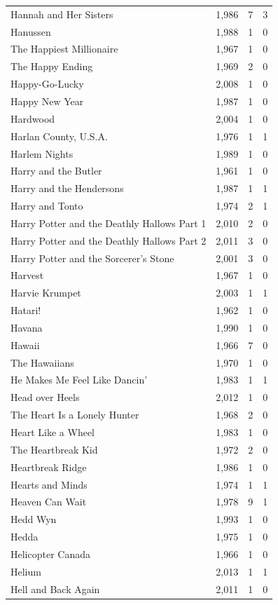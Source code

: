 \begin{tabular}{lrrr}
Hannah and Her Sisters & 1,986 & 7 & 3 \\
Hanussen & 1,988 & 1 & 0 \\
The Happiest Millionaire & 1,967 & 1 & 0 \\
The Happy Ending & 1,969 & 2 & 0 \\
Happy-Go-Lucky & 2,008 & 1 & 0 \\
Happy New Year & 1,987 & 1 & 0 \\
Hardwood & 2,004 & 1 & 0 \\
Harlan County, U.S.A. & 1,976 & 1 & 1 \\
Harlem Nights & 1,989 & 1 & 0 \\
Harry and the Butler & 1,961 & 1 & 0 \\
Harry and the Hendersons & 1,987 & 1 & 1 \\
Harry and Tonto & 1,974 & 2 & 1 \\
Harry Potter and the Deathly Hallows Part 1 & 2,010 & 2 & 0 \\
Harry Potter and the Deathly Hallows Part 2 & 2,011 & 3 & 0 \\
Harry Potter and the Sorcerer's Stone & 2,001 & 3 & 0 \\
Harvest & 1,967 & 1 & 0 \\
Harvie Krumpet & 2,003 & 1 & 1 \\
Hatari! & 1,962 & 1 & 0 \\
Havana & 1,990 & 1 & 0 \\
Hawaii & 1,966 & 7 & 0 \\
The Hawaiians & 1,970 & 1 & 0 \\
He Makes Me Feel Like Dancin' & 1,983 & 1 & 1 \\
Head over Heels & 2,012 & 1 & 0 \\
The Heart Is a Lonely Hunter & 1,968 & 2 & 0 \\
Heart Like a Wheel & 1,983 & 1 & 0 \\
The Heartbreak Kid & 1,972 & 2 & 0 \\
Heartbreak Ridge & 1,986 & 1 & 0 \\
Hearts and Minds & 1,974 & 1 & 1 \\
Heaven Can Wait & 1,978 & 9 & 1 \\
Hedd Wyn & 1,993 & 1 & 0 \\
Hedda & 1,975 & 1 & 0 \\
Helicopter Canada & 1,966 & 1 & 0 \\
Helium & 2,013 & 1 & 1 \\
Hell and Back Again & 2,011 & 1 & 0 \\

\end{tabular}
